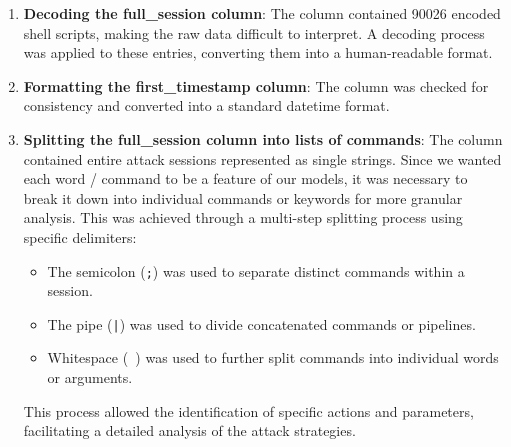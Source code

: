         \begin{enumerate}
        
            \item \textbf{Decoding the \textbf{full\_session} column}: The  column contained 90026 encoded shell scripts, making the raw data difficult to interpret. A decoding process was applied to these entries, converting them into a human-readable format.
            
            \vspace{0.2em}
            
            \item \textbf{Formatting the \textbf{first\_timestamp} column}: The  column was checked for consistency and converted into a standard datetime format.
            
            \vspace{0.2em}
            
            \item \textbf{Splitting the \textbf{full\_session} column into lists of commands}: 
            The  column contained entire attack sessions represented as single strings. Since we wanted each word / command to be a feature of our models, it was necessary to break it down into individual commands or keywords for more granular analysis. This was achieved through a multi-step splitting process using specific delimiters:
            
            \vspace{0.3em}
            
            \begin{itemize}
                \item The semicolon (\texttt{;}) was used to separate distinct commands within a session.
                \item The pipe (\texttt{|}) was used to divide concatenated commands or pipelines.
                \item Whitespace (\texttt{ }) was used to further split commands into individual words or arguments.
            \end{itemize}
            
            \vspace{0.3em}
            
            This process allowed the identification of specific actions and parameters, facilitating a detailed analysis of the attack strategies.
            

\end{enumerate}
